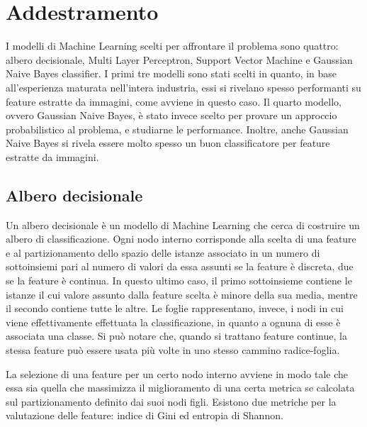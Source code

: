 \section{Addestramento}
I modelli di Machine Learning scelti per affrontare il problema sono quattro:
albero decisionale, Multi Layer Perceptron, Support Vector Machine e
Gaussian Naive Bayes classifier.
I primi tre modelli sono stati scelti in quanto, in base all'esperienza
maturata nell'intera
industria, essi si rivelano spesso performanti su feature estratte da immagini,
come avviene in questo caso.
Il quarto modello, ovvero Gaussian Naive Bayes, è stato invece scelto per provare
un approccio probabilistico al problema, e studiarne le performance. Inoltre,
anche Gaussian Naive Bayes si rivela essere molto spesso un buon classificatore
per feature estratte da immagini.

\subsection{Albero decisionale}
Un albero decisionale è un modello di Machine Learning che cerca di 
costruire un albero di classificazione. Ogni nodo interno corrisponde alla scelta
di una feature e al partizionamento dello spazio delle istanze associato in un 
numero di sottoinsiemi pari al numero di valori da essa assunti se la feature
è discreta, due se la feature è continua.
In questo ultimo caso, il primo sottoinsieme contiene le istanze il cui valore 
assunto dalla feature scelta è minore della sua media, mentre il secondo contiene
tutte le altre.
Le foglie rappresentano, invece, i nodi in cui viene effettivamente
effettuata la classificazione, in quanto a ognuna di esse è associata una classe.
Si può notare che, quando si trattano feature continue, la stessa feature può
essere usata più volte in uno stesso cammino radice-foglia.

La selezione di una feature per un certo nodo interno avviene in modo tale che 
essa sia quella che massimizza il miglioramento di una certa metrica 
se calcolata sul partizionamento definito dai suoi nodi figli. 
Esistono due metriche per la valutazione delle feature: indice di Gini ed entropia
di Shannon.

